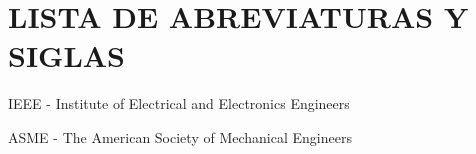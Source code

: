 \section*{LISTA DE ABREVIATURAS Y SIGLAS}
IEEE - Institute of Electrical and Electronics Engineers \par 
ASME - The American Society of Mechanical Engineers
